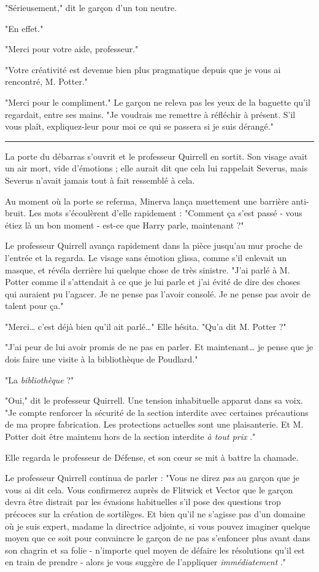 "Sérieusement," dit le garçon d'un ton neutre.

"En effet."

"Merci pour votre aide, professeur."

"Votre créativité est devenue bien plus pragmatique depuis que je vous ai rencontré, M. Potter."

"Merci pour le compliment." Le garçon ne releva pas les yeux de la baguette qu'il regardait, entre ses mains. "Je voudrais me remettre à réfléchir à présent. S'il vous plaît, expliquez-leur pour moi ce qui se passera si je suis dérangé."
\par\noindent\rule{\textwidth}{0.4pt}
La porte du débarras s'ouvrit et le professeur Quirrell en sortit. Son visage avait un air mort, vide d'émotions ; elle aurait dit que cela lui rappelait Severus, mais Severus n'avait jamais tout à fait ressemblé à cela.

Au moment où la porte se referma, Minerva lança muettement une barrière anti-bruit. Les mots s'écoulèrent d'elle rapidement : "Comment ça s'est passé - vous étiez là un bon moment - est-ce que Harry parle, maintenant ?"

Le professeur Quirrell avança rapidement dans la pièce jusqu'au mur proche de l'entrée et la regarda. Le visage sans émotion glissa, comme s'il enlevait un masque, et révéla derrière lui quelque chose de très sinistre. "J'ai parlé à M. Potter comme il s'attendait à ce que je lui parle et j'ai évité de dire des choses qui auraient pu l'agacer. Je ne pense pas l'avoir consolé. Je ne pense pas avoir de talent pour ça."

"Merci… c'est déjà bien qu'il ait parlé…" Elle hésita. "Qu'a dit M. Potter ?"

"J'ai peur de lui avoir promis de ne pas en parler. Et maintenant… je pense que je dois faire une visite à la bibliothèque de Poudlard."

"La \emph{bibliothèque}  ?"

"Oui," dit le professeur Quirrell. Une tension inhabituelle apparut dans sa voix. "Je compte renforcer la sécurité de la section interdite avec certaines précautions de ma propre fabrication. Les protections actuelles sont une plaisanterie. Et M. Potter doit être maintenu hors de la section interdite \emph{à tout prix} ."

Elle regarda le professeur de Défense, et son cœur se mit à battre la chamade.

Le professeur Quirrell continua de parler : "Vous ne direz \emph{pas}  au garçon que je vous ai dit cela. Vous confirmerez auprès de Flitwick et Vector que le garçon devra être distrait par les évasions habituelles s'il pose des questions trop précoces sur la création de sortilèges. Et bien qu'il ne s'agisse pas d'un domaine où je suis expert, madame la directrice adjointe, si vous pouvez imaginer quelque moyen que ce soit pour convaincre le garçon de ne pas s'enfoncer plus avant dans son chagrin et sa folie - n'importe quel moyen de défaire les résolutions qu'il est en train de prendre - alors je vous suggère de l'appliquer \emph{immédiatement} ."


